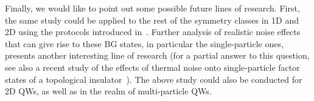 Finally, we would like to point out some possible future lines of research. First, the same study could be applied to the rest of the symmetry classes in 1D and 2D using the protocols introduced in~\cite{kit:rud:ber:dem:10}. Further analysis of realistic noise effects that can give rise to these BG states, in particular the single-particle ones, presents another interesting line of research (for a partial answer to this question, see also a recent study of the effects of thermal noise onto single-particle factor states of a topological insulator~\cite{riv:viy:del:13}). The above study could also be conducted for 2D QWs, as well as in the realm of multi-particle QWs.\\



%
%
%
%
%
%
